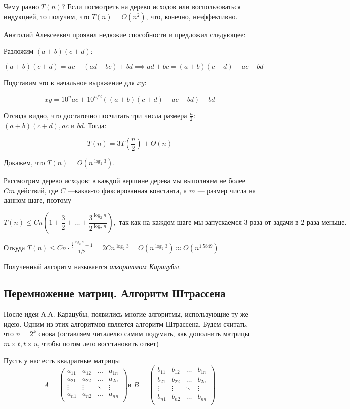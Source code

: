 \documentclass[a4paper, 12pt]{article}
\begin{document}
Чему равно $T(n)$? Если посмотреть на дерево исходов или воспользоваться 
индукцией, то получим, что $T(n) = O(n^2)$, что, конечно,
неэффективно.

Анатолий Алексеевич проявил недюжие способности и предложил
следующее:

Разложим $(a + b)(c + d)$:

\[(a+b)(c+d) = ac+(ad+bc) + bd \implies ad + bc = (a + b)(c + d) - ac - bd\]

Подставим это в начальное выражение для $xy$:

\[xy = 10^{n}ac + 10^{n/2}((a + b)(c + d) - ac - bd)+bd\]

Отсюда видно, что достаточно посчитать три числа размера $\frac{n}{2}$: $(a + b)(c + d), ac$ и $bd$. Тогда:

\[T(n) = 3T\left( \frac{n}{2} \right) + \Theta(n)\]

Докажем, что $T(n) = O(n^{\log_2 3})$.

Рассмотрим дерево исходов: в каждой вершине дерева мы выполняем не более
$Cm$ действий, где $C$ ---какая-то фиксированная константа, а $m$ --- размер числа на данном шаге, поэтому 

\[
  T(n) \leqslant Cn\left(1 + \frac{3}{2} + \ldots + \frac{3^{\log_2 n}}{2^{
  \log_2 n}}\right), \text{ так как
  на каждом шаге мы запускаемся 3 раза от задачи в 2 раза меньше.}
\]

Откуда $T(n) \leqslant Cn \cdot \frac{\frac{3}{2}^{\log_2 n} - 1}{1/2} = 
2Cn^{\log_2 3} = O(n^{\log_2 3}) \approx O(n^{1.5849})$

Полученный алгоритм называется \emph{алгоритмом Карацубы}.

\subsection{Перемножение матриц. Алгоритм Штрассена}

После идеи А.А. Карацубы, появились многие алгоритмы, использующие ту же идею.
Одним из этих алгоритмов является алгоритм Штрассена. Будем считать, что $n = 
2^k$ снова (оставляем читалелю самим подумать, как дополнить матрицы $m \times t,
t \times u$, чтобы потом лего восстановить ответ)

Пусть у нас есть квадратные матрицы
\[A = \begin{pmatrix}
a_{11} & a_{12} & \ldots & a_{1n} \\
a_{21} & a_{22} & \ldots & a_{2n} \\
\vdots & \vdots & \ddots & \vdots \\
a_{n1} & a_{n2} & \ldots & a_{nn} \\
\end{pmatrix}
\text{и } 
B = \begin{pmatrix}
b_{11} & b_{12} & \ldots & b_{1n} \\
b_{21} & b_{22} & \ldots & b_{2n} \\
\vdots & \vdots & \ddots & \vdots \\
b_{n1} & b_{n2} & \ldots & b_{nn} \\
\end{pmatrix}\]
\end{document}
